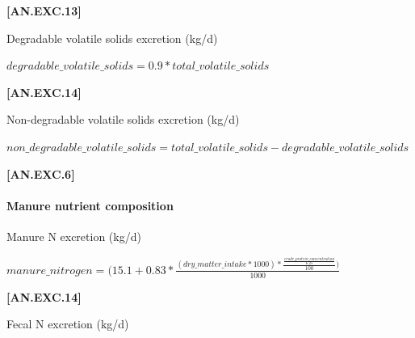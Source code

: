 \begin{refsection}
\begin{itemize}
            {\raggedleft \textbf{[AN.EXC.13]}\par}
            \vspace{0.5cm} 

Degradable volatile solids excretion (kg/d)
        \vspace{0.5cm}
    
    \begin{center}
        \(degradable\_volatile\_solids=0.9 * total\_volatile\_solids\)
    \end{center}
        \vspace{0.5cm} 
    
            {\raggedleft \textbf{[AN.EXC.14]}\par}
            \vspace{0.5cm} 

Non-degradable volatile solids excretion (kg/d)
        \vspace{0.5cm}
    
    \begin{center}
        \(non\_degradable\_volatile\_solids = total\_volatile\_solids - degradable\_volatile\_solids\)
    \end{center}
        \vspace{0.5cm} 
    
            {\raggedleft \textbf{[AN.EXC.6]}\par}
            \vspace{0.5cm} 

\paragraph{Manure nutrient composition}
\vspace{-0.25cm}

Manure N excretion (kg/d)
        \vspace{0.5cm}
    
    \begin{center}
        \(manure\_nitrogen=(15.1+0.83 * \frac{(dry\_matter\_intake * 1000) * \frac{\frac{crude\_protein\_concentration}{6.25}}{100})}{1000}\)
    \end{center}
        \vspace{0.5cm} 
    
            {\raggedleft \textbf{[AN.EXC.14]}\par}
            \vspace{0.5cm} 

Fecal N excretion (kg/d)
        \vspace{0.5cm}
    

\end{itemize}
\end{refsection}
